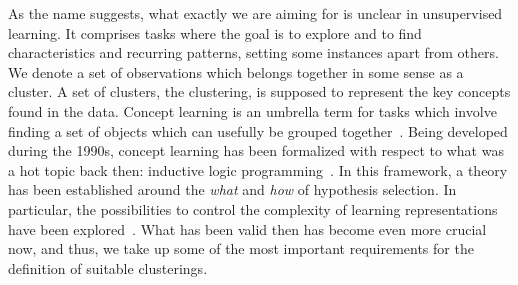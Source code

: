 As the name suggests, what exactly we are aiming for is unclear in unsupervised learning. It comprises tasks where the goal is to explore and to find characteristics and recurring patterns, setting some instances apart from others. We denote a set of observations which belongs together in some sense as a cluster. A set of clusters, the clustering, is supposed to represent the key concepts found in the data. Concept learning is an umbrella term for tasks which involve finding a set of objects which can usefully be grouped together~\citep{morik1993knowledge}. Being developed during the 1990s, concept learning has been formalized with respect to what was a hot topic back then: inductive logic programming~\citep{muggleton1994inductive}. In this framework, a theory has been established around the \emph{what} and \emph{how} of hypothesis selection. In particular, the possibilities to control the complexity of learning representations have been explored~\citep{kietz1992controlling}.  What has been valid then has become even more crucial now, and thus, we take up some of the most important requirements for the definition of suitable clusterings. 
